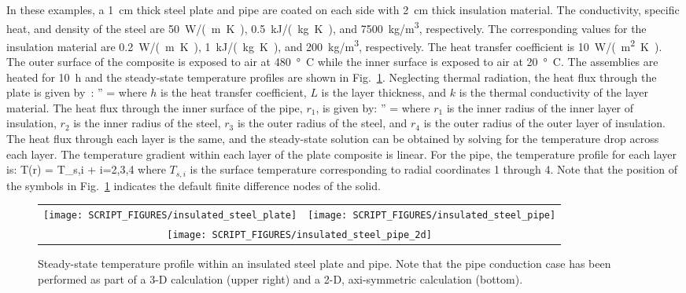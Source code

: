 \documentclass[11pt]{book}
\begin{document}
In these examples, a 1~cm thick steel plate and pipe are coated on each side with 2~cm thick insulation material. The conductivity, specific heat, and density of the steel are 50~\si{W/(m.K)}, 0.5~\si{kJ/(kg.K)}, and 7500~\si{kg/m^3}, respectively. The corresponding values for the insulation material are 0.2~\si{W/(m.K)}, 1~\si{kJ/(kg.K)}, and 200~\si{kg/m^3}, respectively. The heat transfer coefficient is 10~\si{W/(m^2.K)}. The outer surface of the composite is exposed to air at 480~\si{\degree C} while the inner surface is exposed to air at 20~\si{\degree C}. The assemblies are heated for 10~h and the steady-state temperature profiles are shown in Fig.~\ref{insulated_steel_fig}. Neglecting thermal radiation, the heat flux through the plate is given by~\cite{Incropera:1}:
\be
   '' = 
\ee
where $h$ is the heat transfer coefficient, $L$ is the layer thickness, and $k$ is the thermal conductivity of the layer material. The heat flux through the inner surface of the pipe, $r_1$, is given by:
\be
   '' = 
\ee
where $r_1$ is the inner radius of the inner layer of insulation, $r_2$ is the inner radius of the steel, $r_3$ is the outer radius of the steel, and $r_4$ is the outer radius of the outer layer of insulation. The heat flux through each layer is the same, and the steady-state solution can be obtained by solving for the temperature drop across each layer. The temperature gradient within each layer of the plate composite is linear. For the pipe, the temperature profile for each layer is:
\be
   T(r) = T_{s,i} +  \ln {} \quad \quad i=2,3,4
\ee
where $T_{s,i}$ is the surface temperature corresponding to radial coordinates 1 through 4. Note that the position of the symbols in Fig.~\ref{insulated_steel_fig} indicates the default finite difference nodes of the solid.

\begin{figure}[ht]
\noindent
\begin{tabular*}{\textwidth}{l@{\extracolsep{\fill}}r}
\texttt{[image: SCRIPT\_FIGURES/insulated\_steel\_plate]} &
\texttt{[image: SCRIPT\_FIGURES/insulated\_steel\_pipe]} \\
\multicolumn{2}{c}{\texttt{[image: SCRIPT\_FIGURES/insulated\_steel\_pipe\_2d]}}
\end{tabular*}
\caption[The  test cases]{Steady-state temperature profile within an insulated steel plate and pipe. Note that the pipe conduction case has been performed as part of a 3-D calculation (upper right) and a 2-D, axi-symmetric calculation (bottom).}
\label{insulated_steel_fig}
\end{figure}
\end{document}
